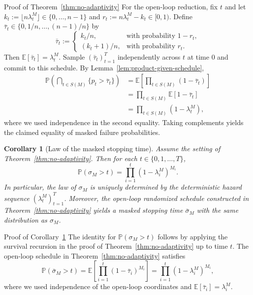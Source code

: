 \documentclass{uai2026} %
\newtheorem{corollary}[theorem]{Corollary}
\newcommand{\1}{\mathbf{1}}
\newcommand{\prob}{\mathbb{P}}
\newcommand{\expec}{\mathbb{E}}
\begin{document}
\begin{appendixproof}{Proof of Theorem~\ref{thm:no-adaptivity}}
  For the open-loop reduction, fix $t$ and let $k_{t}:=\lfloor n\lambda_{t}^{M}\rfloor\in\{0,\dots,n-1\}$ and $r_{t}:=n\lambda_{t}^{M}-k_{t}\in[0,1)$.
  Define $\bar{\tau}_{t}\in\{0,1/n,\dots,(n-1)/n\}$ by
  \begin{equation*}
    \bar{\tau}_{t}
    :=
    \begin{cases}
      k_{t}/n, & \text{with probability }1-r_{t},\\
      (k_{t}+1)/n, & \text{with probability }r_{t}.
    \end{cases}
  \end{equation*}
  Then $\expec[\bar{\tau}_{t}]=\lambda_{t}^{M}$.
  Sample $(\bar{\tau}_{t})_{t=1}^{T}$ independently across $t$ at time $0$ and commit to this schedule.
  By Lemma~\ref{lem:product-given-schedule},
  \begin{equation*}
    \begin{aligned}
      \prob\left(\bigcap_{t\in S(M)}\{p_{t}>\bar{\tau}_{t}\}\right)
      &= \expec\left[\prod_{t\in S(M)}(1-\bar{\tau}_{t})\right]\\
      &= \prod_{t\in S(M)}\expec[1-\bar{\tau}_{t}]\\
      &= \prod_{t\in S(M)}(1-\lambda_{t}^{M}),
    \end{aligned}
  \end{equation*}
  where we used independence in the second equality.
  Taking complements yields the claimed equality of masked failure probabilities.
\end{appendixproof}

\begin{corollary}[Law of the masked stopping time]
  \label{cor:sigma-law}
  Assume the setting of Theorem~\ref{thm:no-adaptivity}.
  Then for each $t\in\{0,1,\dots,T\}$,
  \begin{equation*}
    \prob(\sigma_{M}>t)=\prod_{i=1}^{t}(1-\lambda_{i}^{M})^{M_{i}}.
  \end{equation*}
  In particular, the law of $\sigma_{M}$ is uniquely determined by the deterministic hazard sequence $(\lambda_{t}^{M})_{t=1}^{T}$.
  Moreover, the open-loop randomized schedule constructed in Theorem~\ref{thm:no-adaptivity} yields a masked stopping time $\bar{\sigma}_{M}$ with the same distribution as $\sigma_{M}$.
\end{corollary}

\begin{appendixproof}{Proof of Corollary~\ref{cor:sigma-law}}
  The identity for $\prob(\sigma_{M}>t)$ follows by applying the survival recursion in the proof of Theorem~\ref{thm:no-adaptivity} up to time $t$.
  The open-loop schedule in Theorem~\ref{thm:no-adaptivity} satisfies
  \begin{equation*}
    \prob(\bar{\sigma}_{M}>t)=\expec\left[\prod_{i=1}^{t}(1-\bar{\tau}_{i})^{M_{i}}\right]=\prod_{i=1}^{t}(1-\lambda_{i}^{M})^{M_{i}},
  \end{equation*}
  where we used independence of the open-loop coordinates and $\expec[\bar{\tau}_{i}]=\lambda_{i}^{M}$.
\end{appendixproof}
\end{document}

